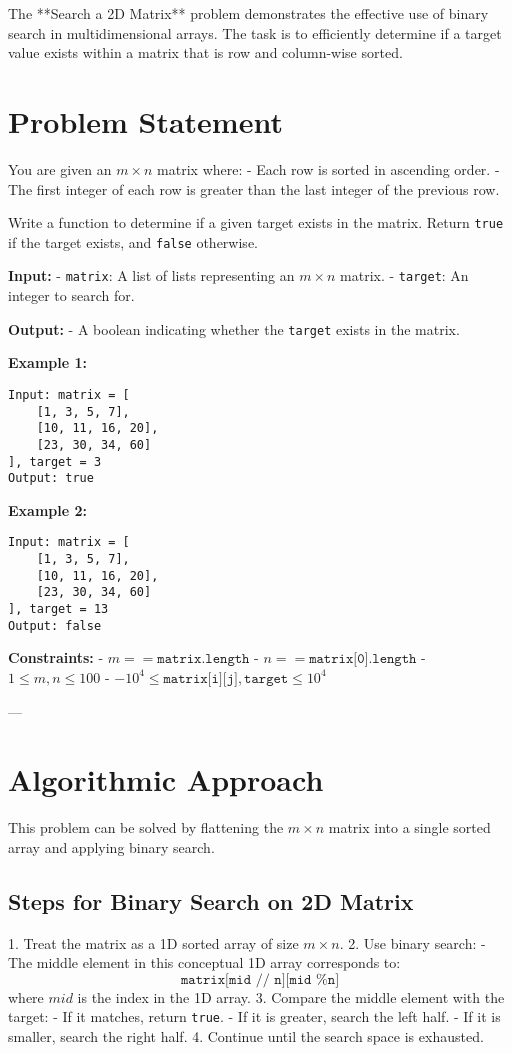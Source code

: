 
\label{problem:Search_2D_Matrix}

The **Search a 2D Matrix** problem demonstrates the effective use of binary search in multidimensional arrays. The task is to efficiently determine if a target value exists within a matrix that is row and column-wise sorted.

\section*{Problem Statement}
You are given an \(m \times n\) matrix where:
- Each row is sorted in ascending order.
- The first integer of each row is greater than the last integer of the previous row.

Write a function to determine if a given target exists in the matrix. Return \texttt{true} if the target exists, and \texttt{false} otherwise.

\textbf{Input:}
- \texttt{matrix}: A list of lists representing an \(m \times n\) matrix.
- \texttt{target}: An integer to search for.

\textbf{Output:}
- A boolean indicating whether the \texttt{target} exists in the matrix.

\textbf{Example 1:}
\begin{verbatim}
Input: matrix = [
    [1, 3, 5, 7],
    [10, 11, 16, 20],
    [23, 30, 34, 60]
], target = 3
Output: true
\end{verbatim}

\textbf{Example 2:}
\begin{verbatim}
Input: matrix = [
    [1, 3, 5, 7],
    [10, 11, 16, 20],
    [23, 30, 34, 60]
], target = 13
Output: false
\end{verbatim}

\textbf{Constraints:}
- \(m == \texttt{matrix.length}\)
- \(n == \texttt{matrix[0].length}\)
- \(1 \leq m, n \leq 100\)
- \(-10^4 \leq \texttt{matrix[i][j]}, \texttt{target} \leq 10^4\)

---

\section*{Algorithmic Approach}
This problem can be solved by flattening the \(m \times n\) matrix into a single sorted array and applying binary search.

\subsection*{Steps for Binary Search on 2D Matrix}
1. Treat the matrix as a 1D sorted array of size \(m \times n\).
2. Use binary search:
    - The middle element in this conceptual 1D array corresponds to:
      \[
      \texttt{matrix[mid // n][mid \% n]}
      \]
      where \(mid\) is the index in the 1D array.
3. Compare the middle element with the target:
    - If it matches, return \texttt{true}.
    - If it is greater, search the left half.
    - If it is smaller, search the right half.
4. Continue until the search space is exhausted.

